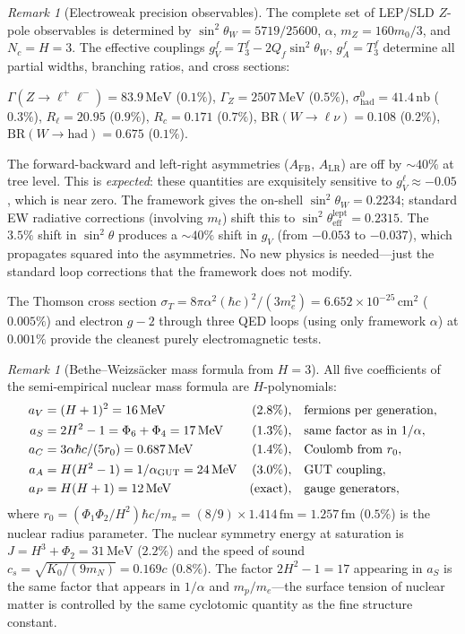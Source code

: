 \documentclass[11pt,a4paper]{article}
\theoremstyle{definition}
\theoremstyle{remark}
\newtheorem{remark}[theorem]{Remark}
\begin{document}
\begin{remark}[Electroweak precision observables]\label{rem:ew_precision}
The complete set of LEP/SLD $Z$-pole observables is determined by $\sin^2\theta_W=5719/25600$, $\alpha$, $m_Z=160m_0/3$, and $N_c=H=3$. The effective couplings $g_V^f=T_3^f-2Q_f\sin^2\theta_W$, $g_A^f=T_3^f$ determine all partial widths, branching ratios, and cross sections:

$\Gamma(Z\to\ell^+\ell^-)=83.9\,\mathrm{MeV}$ ($0.1\%$), $\Gamma_Z=2507\,\mathrm{MeV}$ ($0.5\%$), $\sigma^0_\mathrm{had}=41.4\,\mathrm{nb}$ ($0.3\%$), $R_\ell=20.95$ ($0.9\%$), $R_c=0.171$ ($0.7\%$), $\mathrm{BR}(W\to\ell\nu)=0.108$ ($0.2\%$), $\mathrm{BR}(W\to\mathrm{had})=0.675$ ($0.1\%$).

The forward-backward and left-right asymmetries ($A_\mathrm{FB}$, $A_\mathrm{LR}$) are off by $\sim\!40\%$ at tree level. This is \emph{expected}: these quantities are exquisitely sensitive to $g_V^\ell\approx -0.05$, which is near zero. The framework gives the on-shell $\sin^2\theta_W=0.2234$; standard EW radiative corrections (involving $m_t$) shift this to $\sin^2\theta_\mathrm{eff}^\mathrm{lept}=0.2315$. The $3.5\%$ shift in $\sin^2\theta$ produces a $\sim\!40\%$ shift in $g_V$ (from $-0.053$ to $-0.037$), which propagates squared into the asymmetries. No new physics is needed---just the standard loop corrections that the framework does not modify.

The Thomson cross section $\sigma_T=8\pi\alpha^2(\hbar c)^2/(3m_e^2)=6.652\times 10^{-25}\,\mathrm{cm}^2$ ($0.005\%$) and electron $g\!-\!2$ through three QED loops (using only framework $\alpha$) at $0.001\%$ provide the cleanest purely electromagnetic tests.
\end{remark}

\begin{remark}[Bethe--Weizs\"acker mass formula from $H=3$]\label{rem:semf}
All five coefficients of the semi-empirical nuclear mass formula are $H$-polynomials:
\begin{align}
a_V &= (H+1)^2 = 16\,\mathrm{MeV} &(2.8\%),\quad &\text{fermions per generation}, \notag\\
a_S &= 2H^2-1 = \Phi_6+\Phi_4 = 17\,\mathrm{MeV} &(1.3\%),\quad &\text{same factor as in $1/\alpha$}, \notag\\
a_C &= 3\alpha\hbar c/(5r_0) = 0.687\,\mathrm{MeV} &(1.4\%),\quad &\text{Coulomb from $r_0$}, \notag\\
a_A &= H(H^2-1) = 1/\alpha_\mathrm{GUT} = 24\,\mathrm{MeV} &(3.0\%),\quad &\text{GUT coupling}, \notag\\
a_P &= H(H+1) = 12\,\mathrm{MeV} &(\text{exact}),\quad &\text{gauge generators}, \notag
\end{align}
where $r_0=(\Phi_1\Phi_2/H^2)\hbar c/m_\pi=(8/9)\times 1.414\,\mathrm{fm}=1.257\,\mathrm{fm}$ ($0.5\%$) is the nuclear radius parameter. The nuclear symmetry energy at saturation is $J=H^3+\Phi_2=31\,\mathrm{MeV}$ ($2.2\%$) and the speed of sound $c_s=\sqrt{K_0/(9m_N)}=0.169c$ ($0.8\%$). The factor $2H^2-1=17$ appearing in $a_S$ is the same factor that appears in $1/\alpha$ and $m_p/m_e$---the surface tension of nuclear matter is controlled by the same cyclotomic quantity as the fine structure constant.
\end{remark}
\end{document}

